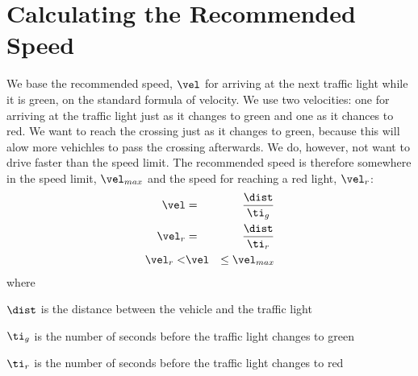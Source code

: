 \section{Calculating the Recommended Speed}

We base the recommended speed, $\vel$ for arriving at the next traffic light while it is green, on the standard formula of velocity.
We use two velocities: one for arriving at the traffic light just as it changes to green and one as it chances to red.
We want to reach the crossing just as it changes to green, because this will alow more vehichles to pass the crossing afterwards.
We do, however, not want to drive faster than the speed limit.
The recommended speed is therefore somewhere in the speed limit, $\vel_{max}$ and the speed for reaching a red light, $\vel_r$:
\begin{eqnarray}
\vel &=& \frac{\dist}{\ti_g}\label{eq:Math:h}\\
\vel_r &=& \frac{\dist}{\ti_r}\nonumber\\
\vel_r < &\vel& \leq \vel_{max}\label{eq:Math:recSpeed}
\end{eqnarray}
where
\vspace{-5mm}
\begin{itemize*}
\item $\dist$ is the distance between the vehicle and the traffic light
\item $\ti_g$ is the number of seconds before the traffic light changes to green
\item $\ti_r$ is the number of seconds before the traffic light changes to red
\end{itemize*}

